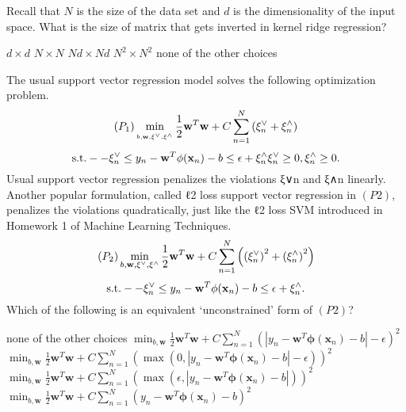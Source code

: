 \documentclass[a4paper,10pt]{exam}
\begin{document}
\begin{questions}
	\question Recall that $N$ is the size of the data set and $d$ is the dimensionality of the input space. What is the size of matrix that gets inverted in kernel ridge regression?
	\begin{checkboxes}
	\choice $d \times d$
	\CorrectChoice $N \times N$
	\choice $Nd \times Nd$
	\choice $N^2 \times N^2$
	\choice none of the other choices\\
	\end{checkboxes}
	
	\question The usual support vector regression model solves the following optimization problem.
\[({P_1})\mathop {\min }\limits_{_{b,{\bf{w}},{{\bf{\xi }}^ \vee },{{\bf{\xi }}^ \wedge }}} \frac{1}{2}{{\bf{w}}^T}{\bf{w}} + C\sum\limits_{n = 1}^N {\left( {\xi _n^ \vee  + \xi _n^ \wedge } \right)}\]\[ {\rm{  s}}.{\rm{t}}. -  - \xi _n^ \vee  \le {y_n} - {{\bf{w}}^T}\phi ({{\bf{x}}_n}) - b \le \epsilon + \xi _n^ \wedge \xi _n^ \vee  \ge 0,\xi _n^ \wedge  \ge 0.\]
Usual support vector regression penalizes the violations ξ∨n and ξ∧n linearly. Another popular formulation, called ℓ2 loss support vector regression in $(P2)$, penalizes the violations quadratically, just like the ℓ2 loss SVM introduced in Homework 1 of Machine Learning Techniques.
\[({P_2})\mathop {\min }\limits_{b,{\bf{w}},{{\bf{\xi }}^ \vee },{{\bf{\xi }}^ \wedge }} \frac{1}{2}{{\bf{w}}^T}{\bf{w}} + C\sum\limits_{n = 1}^N {\left( {{{(\xi _n^ \vee )}^2} + {{(\xi _n^ \wedge )}^2}} \right)} \]
\[{\rm{s}}.{\rm{t}}. -  - \xi _n^ \vee  \le {y_n} - {{\bf{w}}^T}\phi ({{\bf{x}}_n}) - b \le \epsilon  + \xi _n^ \wedge .\]
Which of the following is an equivalent `unconstrained' form of $(P2)$?

\begin{checkboxes}
	\choice none of the other choices
	\choice $\min_{b, \mathbf{w}} \frac{1}{2} \mathbf{w}^T \mathbf{w} + C \sum_{n=1}^N (|y_n - \mathbf{w}^T \mathbf{\phi}(\mathbf{x}_n) - b| - \epsilon)^2$
	\CorrectChoice $\min_{b, \mathbf{w}} \frac{1}{2} \mathbf{w}^T \mathbf{w} + C \sum_{n=1}^N (\max(0, |y_n - \mathbf{w}^T \mathbf{\phi}(\mathbf{x}_n) - b| - \epsilon))^2$\
	\choice $\min_{b, \mathbf{w}} \frac{1}{2} \mathbf{w}^T \mathbf{w} + C \sum_{n=1}^N (\max(\epsilon, |y_n - \mathbf{w}^T \mathbf{\phi}(\mathbf{x}_n) - b|    ))^2$
	\choice $\min_{b, \mathbf{w}} \frac{1}{2} \mathbf{w}^T \mathbf{w} + C \sum_{n=1}^N (y_n - \mathbf{w}^T \mathbf{\phi}(\mathbf{x}_n) - b)^2$\\
\end{checkboxes}	


\end{questions}
\end{document}
